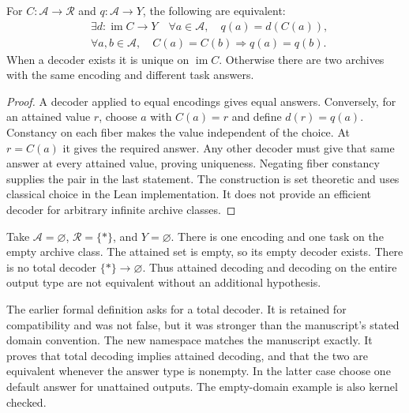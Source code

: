\begin{PPTtheorem}
\label{PPT:res:new:factorization}
For $C:\mathscr A\to\mathcal R$ and $q:\mathscr A\to Y$, the following are equivalent:
\[
\begin{aligned}
 &\exists d:\operatorname{im}C\to Y\quad
       \forall a\in\mathscr A,\quad q(a)=d(C(a)),\\
 &\forall a,b\in\mathscr A,\quad C(a)=C(b)\Longrightarrow q(a)=q(b).
\end{aligned}
\]
When a decoder exists it is unique on $\operatorname{im}C$. Otherwise there are two archives with the same encoding and different task answers.
\end{PPTtheorem}
\begin{proof}
A decoder applied to equal encodings gives equal answers. Conversely, for an attained value $r$, choose $a$ with $C(a)=r$ and define $d(r)=q(a)$. Constancy on each fiber makes the value independent of the choice. At $r=C(a)$ it gives the required answer. Any other decoder must give that same answer at every attained value, proving uniqueness. Negating fiber constancy supplies the pair in the last statement. The construction is set theoretic and uses classical choice in the Lean implementation. It does not provide an efficient decoder for arbitrary infinite archive classes.
\end{proof}

\begin{PPTexample}
\label{PPT:res:new:empty-decoder}
Take $\mathscr A=\varnothing$, $\mathcal R=\{*\}$, and $Y=\varnothing$. There is one encoding and one task on the empty archive class. The attained set is empty, so its empty decoder exists. There is no total decoder $\{*\}\to\varnothing$. Thus attained decoding and decoding on the entire output type are not equivalent without an additional hypothesis.
\end{PPTexample}

The earlier formal definition  asks for a total decoder. It is retained for compatibility and was not false, but it was stronger than the manuscript's stated domain convention. The new namespace  matches the manuscript exactly. It proves that total decoding implies attained decoding, and that the two are equivalent whenever the answer type is nonempty. In the latter case choose one default answer for unattained outputs. The empty-domain example is also kernel checked.

